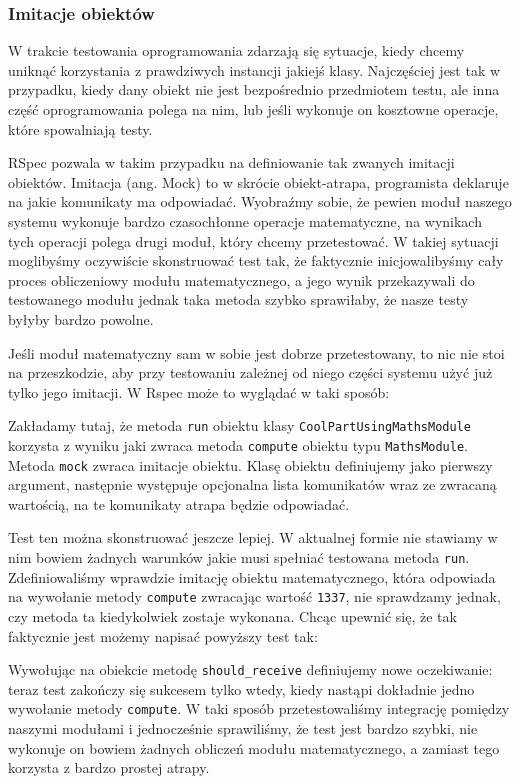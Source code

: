     \subsubsection{Imitacje obiektów}
    W trakcie testowania oprogramowania zdarzają się sytuacje, kiedy chcemy uniknąć korzystania z prawdziwych instancji jakiejś klasy. Najczęściej jest tak w przypadku, kiedy dany obiekt nie jest bezpośrednio przedmiotem testu, ale inna część oprogramowania polega na nim, lub jeśli wykonuje on kosztowne operacje, które spowalniają testy.
    
    RSpec pozwala w takim przypadku na definiowanie tak zwanych imitacji obiektów. Imitacja (ang. Mock) to w skrócie obiekt-atrapa, programista deklaruje na jakie komunikaty ma odpowiadać. Wyobraźmy sobie, że pewien moduł naszego systemu wykonuje bardzo czasochłonne operacje matematyczne, na wynikach tych operacji polega drugi moduł, który chcemy przetestować. W takiej sytuacji moglibyśmy oczywiście skonstruować test tak, że faktycznie inicjowalibyśmy cały proces obliczeniowy modułu matematycznego, a jego wynik przekazywali do testowanego modułu jednak taka metoda szybko sprawiłaby, że nasze testy byłyby bardzo powolne. 
    
    Jeśli moduł matematyczny sam w sobie jest dobrze przetestowany, to nic nie stoi na przeszkodzie, aby przy testowaniu zależnej od niego części systemu użyć już tylko jego imitacji. W Rspec może to wyglądać w taki sposób:
    
    
    
    Zakładamy tutaj, że metoda \verb+run+ obiektu klasy \verb+CoolPartUsingMathsModule+ korzysta z wyniku jaki zwraca metoda \verb+compute+ obiektu typu \verb+MathsModule+. Metoda \verb+mock+ zwraca imitacje obiektu. Klasę obiektu definiujemy jako pierwszy argument, następnie występuje opcjonalna lista komunikatów wraz ze zwracaną wartością, na te komunikaty atrapa będzie odpowiadać.
    
    Test ten można skonstruować jeszcze lepiej. W aktualnej formie nie stawiamy w nim bowiem żadnych warunków jakie musi spełniać testowana metoda \verb+run+. Zdefiniowaliśmy wprawdzie imitację obiektu matematycznego, która odpowiada na wywołanie metody \verb+compute+ zwracając wartość \verb+1337+, nie sprawdzamy jednak, czy metoda ta kiedykolwiek zostaje wykonana. Chcąc upewnić się, że tak faktycznie jest możemy napisać powyższy test tak:
    
    

    
    Wywołując na obiekcie metodę \verb+should_receive+ definiujemy nowe oczekiwanie: teraz test zakończy się sukcesem tylko wtedy, kiedy nastąpi dokładnie jedno wywołanie metody \verb+compute+. W taki sposób przetestowaliśmy integrację pomiędzy naszymi modułami i jednocześnie sprawiliśmy, że test jest bardzo szybki, nie wykonuje on bowiem żadnych obliczeń modułu matematycznego, a zamiast tego korzysta z bardzo prostej atrapy.